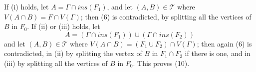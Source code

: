 If (i) holds, let $A = \Gamma \cap ins(F_1)$, and let $(A, B) \in \mathcal{T}$ where $V(A \cap B) = F \cap V(\Gamma)$; then (6) is contradicted, by splitting all the vertices of $B$ in $F_0$. If (ii) or (iii) holds, let
\begin{equation*}
A = (\Gamma \cap ins(F_1)) \cup (\Gamma \cap ins(F_2))
\end{equation*}
and let $(A, B) \in \mathcal{T}$ where $V(A \cap B) = (F_1 \cup F_2) \cap V(\Gamma)$; then again (6) is contradicted, in (ii) by splitting the vertex of $B$ in $F_1 \cap F_2$ if there is one, and in (iii) by splitting all the vertices of $B$ in $F_0$. This proves (10).
